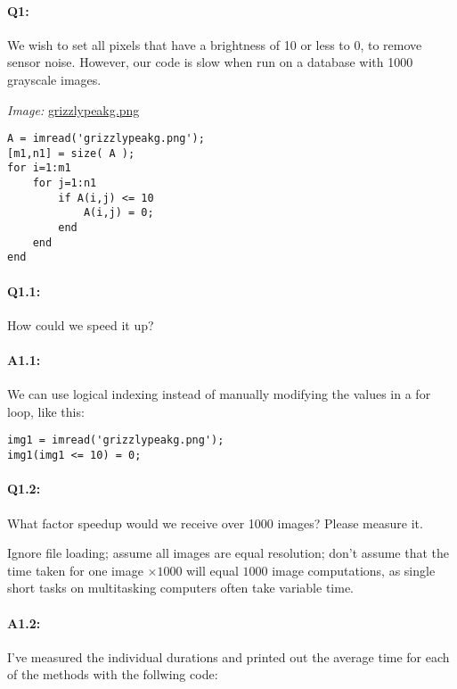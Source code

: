\documentclass[11pt]{article}
\begin{document}
\paragraph{Q1:} We wish to set all pixels that have a brightness of 10 or less to 0, to remove sensor noise. However, our code is slow when run on a database with 1000 grayscale images.

\emph{Image:} \href{grizzlypeakg.png}{grizzlypeakg.png}

\begin{lstlisting}[style=Matlab-editor]
A = imread('grizzlypeakg.png');
[m1,n1] = size( A );
for i=1:m1
    for j=1:n1
        if A(i,j) <= 10
            A(i,j) = 0;
        end
    end
end
\end{lstlisting}

\paragraph{Q1.1:} How could we speed it up?

\paragraph{A1.1:}
We can use logical indexing instead of manually modifying the values in a for loop, like this:
\begin{lstlisting}[style=Matlab-editor]
img1 = imread('grizzlypeakg.png');
img1(img1 <= 10) = 0;
\end{lstlisting}



\pagebreak
\paragraph{Q1.2:} What factor speedup would we receive over 1000 images? Please measure it.

Ignore file loading; assume all images are equal resolution; don't assume that the time taken for one image $\times1000$ will equal $1000$ image computations, as single short tasks on multitasking computers often take variable time.

\paragraph{A1.2:}
I've measured the individual durations and printed out the average time for each of the methods with the follwing code:
\end{document}
